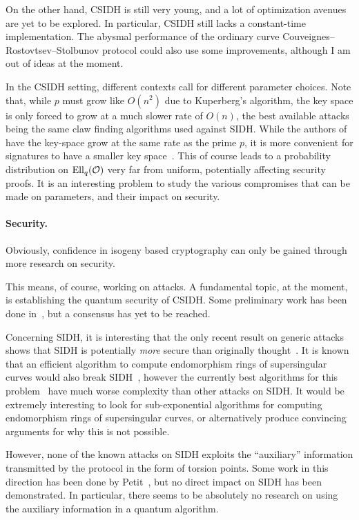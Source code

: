 \documentclass[b5layout]{hdr}
\begin{document}
On the other hand, CSIDH is still very young, and a lot of
optimization avenues are yet to be explored. %
In particular, CSIDH still lacks a constant-time implementation. %
The abysmal performance of the ordinary curve
Couveignes--Rostovtsev--Stolbunov protocol could also use some
improvements, although I am out of ideas at the moment.

In the CSIDH setting, different contexts call for different parameter
choices. %
Note that, while $p$ must grow like $O(n^2)$ due to Kuperberg's
algorithm, the key space is only forced to grow at a much slower rate
of $O(n)$, the best available attacks being the same claw finding
algorithms used against SIDH. %
While the authors of~\cite{10.1007/978-3-030-03332-3_15} have the key-space
grow at the same rate as the prime $p$, it is more convenient for
signatures to have a smaller key space~\cite{cryptoeprint:2018:824}. %
This of course leads to a probability distribution on $\operatorname{Ell}_q(\mathcal{O})$
very far from uniform, potentially affecting security proofs. %
It is an interesting problem to study the various compromises that can
be made on parameters, and their impact on security.

\paragraph{Security.}
Obviously, confidence in isogeny based cryptography can only be gained
through more research on security. %

This means, of course, working on attacks. %
A fundamental topic, at the moment, is establishing the quantum
security of CSIDH. %
Some preliminary work has been done
in~\cite{cryptoeprint:2018:537,BIJ18,Jao-etal-kuperberg-2018}, but a consensus has yet
to be reached. %

Concerning SIDH, it is interesting that the only recent result on
generic attacks shows that SIDH is potentially \emph{more} secure than
originally thought~\cite{cryptoeprint:2018:313}. %
It is known that an efficient algorithm to compute endomorphism rings
of supersingular curves would also break
SIDH~\cite{galbraithsecurity}, however the currently best algorithms
for this problem~\cite{cervino04,kohel} have much worse
complexity than other attacks on SIDH. %
It would be extremely interesting to look for sub-exponential
algorithms for computing endomorphism rings of supersingular curves,
or alternatively produce convincing arguments for why this is not
possible.

However, none of the known attacks on SIDH exploits the ``auxiliary''
information transmitted by the protocol in the form of torsion
points. %
Some work in this direction has been done by
Petit~\cite{10.1007/978-3-319-70697-9_12}, but no direct impact on
SIDH has been demonstrated. %
In particular, there seems to be absolutely no research on using the
auxiliary information in a quantum algorithm. %
\end{document}
